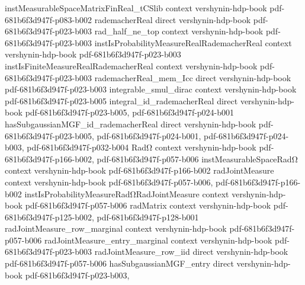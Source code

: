 \begin{lemma}
\label{hasSubgaussianMGF_row_proj}
\leanok
{}
\proofstep
  {instMeasurableSpaceMatrixFinReal_tCSlib}
  {context}
  {vershynin-hdp-book}
  {pdf-681b6f3d947f-p083-b002}
\proofstep
  {rademacherReal}
  {direct}
  {vershynin-hdp-book}
  {pdf-681b6f3d947f-p023-b003}
\proofstep
  {rad_half_ne_top}
  {context}
  {vershynin-hdp-book}
  {pdf-681b6f3d947f-p023-b003}
\proofstep
  {instIsProbabilityMeasureRealRademacherReal}
  {context}
  {vershynin-hdp-book}
  {pdf-681b6f3d947f-p023-b003}
\proofstep
  {instIsFiniteMeasureRealRademacherReal}
  {context}
  {vershynin-hdp-book}
  {pdf-681b6f3d947f-p023-b003}
\proofstep
  {rademacherReal_mem_Icc}
  {direct}
  {vershynin-hdp-book}
  {pdf-681b6f3d947f-p023-b003}
\proofstep
  {integrable_smul_dirac}
  {context}
  {vershynin-hdp-book}
  {pdf-681b6f3d947f-p023-b005}
\proofstep
  {integral_id_rademacherReal}
  {direct}
  {vershynin-hdp-book}
  {pdf-681b6f3d947f-p023-b005,
    pdf-681b6f3d947f-p024-b001}
\proofstep
  {hasSubgaussianMGF_id_rademacherReal}
  {direct}
  {vershynin-hdp-book}
  {pdf-681b6f3d947f-p023-b005,
    pdf-681b6f3d947f-p024-b001,
    pdf-681b6f3d947f-p024-b003,
    pdf-681b6f3d947f-p032-b004}
\proofstep
  {RadΩ}
  {context}
  {vershynin-hdp-book}
  {pdf-681b6f3d947f-p166-b002,
    pdf-681b6f3d947f-p057-b006}
\proofstep
  {instMeasurableSpaceRadΩ}
  {context}
  {vershynin-hdp-book}
  {pdf-681b6f3d947f-p166-b002}
\proofstep
  {radJointMeasure}
  {context}
  {vershynin-hdp-book}
  {pdf-681b6f3d947f-p057-b006,
    pdf-681b6f3d947f-p166-b002}
\proofstep
  {instIsProbabilityMeasureRadΩRadJointMeasure}
  {context}
  {vershynin-hdp-book}
  {pdf-681b6f3d947f-p057-b006}
\proofstep
  {radMatrix}
  {context}
  {vershynin-hdp-book}
  {pdf-681b6f3d947f-p125-b002,
    pdf-681b6f3d947f-p128-b001}
\proofstep
  {radJointMeasure_row_marginal}
  {context}
  {vershynin-hdp-book}
  {pdf-681b6f3d947f-p057-b006}
\proofstep
  {radJointMeasure_entry_marginal}
  {context}
  {vershynin-hdp-book}
  {pdf-681b6f3d947f-p023-b003}
\proofstep
  {radJointMeasure_row_iid}
  {direct}
  {vershynin-hdp-book}
  {pdf-681b6f3d947f-p057-b006}
\proofstep
  {hasSubgaussianMGF_entry}
  {direct}
  {vershynin-hdp-book}
  {pdf-681b6f3d947f-p023-b003,
}
\end{lemma}
